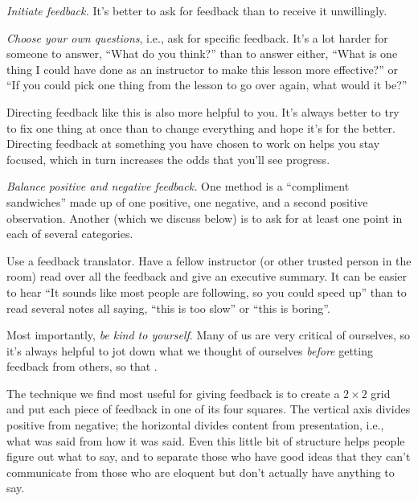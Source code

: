 \begin{genumerate}

\item
  \emph{Initiate feedback.} It's better to ask for feedback than to
  receive it unwillingly.

\item
  \emph{Choose your own questions}, i.e., ask for specific
  feedback. It's a lot harder for someone to answer, ``What do you
  think?'' than to answer either, ``What is one thing I could have
  done as an instructor to make this lesson more effective?''  or ``If
  you could pick one thing from the lesson to go over again, what
  would it be?''

  Directing feedback like this is also more helpful to you.  It's
  always better to try to fix one thing at once than to change
  everything and hope it's for the better.  Directing feedback at
  something you have chosen to work on helps you stay focused, which
  in turn increases the odds that you'll see progress.

\item
  \emph{Balance positive and negative feedback.}  One method is a
  ``compliment sandwiches'' made up of one positive, one negative, and
  a second positive observation.  Another (which we discuss below) is
  to ask for at least one point in each of several categories.

\item
  Use a feedback translator. Have a fellow instructor (or other
  trusted person in the room) read over all the feedback and give an
  executive summary. It can be easier to hear ``It sounds like most
  people are following, so you could speed up'' than to read several
  notes all saying, ``this is too slow'' or ``this is boring''.

\item
  Most importantly, \emph{be kind to yourself}.  Many of us are very
  critical of ourselves, so it's always helpful to jot down what we
  thought of ourselves \emph{before} getting feedback from others,
  so that .

\end{genumerate}

The technique we find most useful for giving feedback is to create a
$2{\times}2$ grid and put each piece of feedback in one of its four
squares.  The vertical axis divides positive from negative; the
horizontal divides content from presentation, i.e., what was said from
how it was said.  Even this little bit of structure helps people
figure out what to say, and to separate those who have good ideas that
they can't communicate from those who are eloquent but don't actually
have anything to say.

